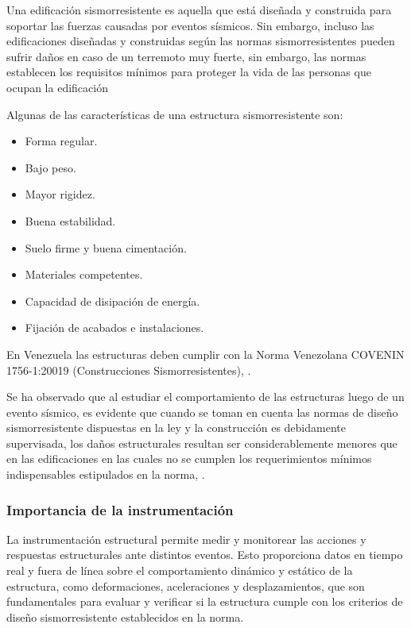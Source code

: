 Una edificación sismorresistente es aquella que está diseñada y construida para soportar las fuerzas causadas por eventos sísmicos. Sin embargo, incluso las edificaciones diseñadas y construidas según las normas sismorresistentes pueden sufrir daños en caso de un terremoto muy fuerte, sin embargo, las normas establecen los requisitos mínimos para proteger la vida de
las personas que ocupan la edificación

Algunas de las características de una estructura sismorresistente son:

        \begin{itemize}
            \item Forma regular.
            \item Bajo peso.
            \item Mayor rigidez.
            \item Buena estabilidad.
            \item Suelo firme y buena cimentación.
            \item Materiales competentes.
            \item Capacidad de disipación de energía.
            \item Fijación de acabados e instalaciones.
        \end{itemize}

En Venezuela las estructuras deben cumplir con la Norma Venezolana COVENIN 1756-1:20019 (Construcciones Sismorresistentes), \citep{covenin}.

Se ha observado que al estudiar el comportamiento de las estructuras luego de un evento sísmico, es evidente que cuando se toman en cuenta las normas de diseño sismorresistente dispuestas en la ley y la construcción es debidamente supervisada, los daños estructurales resultan ser considerablemente menores que en las edificaciones en las cuales no se cumplen los requerimientos mínimos indispensables estipulados en la norma, \citep{blanco2012criterios}.

\subsubsection{Importancia de la instrumentación} La instrumentación estructural permite medir y monitorear las acciones y respuestas estructurales ante distintos eventos. Esto proporciona datos en tiempo real y fuera de línea sobre el comportamiento dinámico y estático de la estructura, como deformaciones, aceleraciones y desplazamientos, que son fundamentales para evaluar y verificar si la estructura cumple con los criterios de diseño sismorresistente establecidos en la norma.

